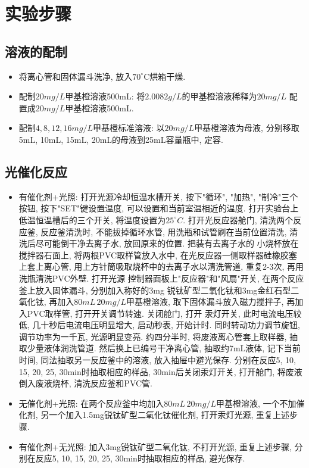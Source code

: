 \documentclass[a4paper]{article}
\begin{document}
\section{实验步骤}
\subsection{溶液的配制}
\begin{itemize}
	\item 将离心管和固体漏斗洗净, 放入$70^\circ$C烘箱干燥.
	\item 配制$20mg/L$甲基橙溶液500mL: 将$2.0082g/L$的甲基橙溶液稀释为$20mg/L$
	配置成$20mg/L$甲基橙溶液500mL.
	\item 配制$4, 8, 12, 16mg/L$甲基橙标准溶液: 以$20mg/L$甲基橙溶液为母液, 分别移取5mL, 
	10mL, 15mL, 20mL的母液到25mL容量瓶中, 定容.
\end{itemize}
\subsection{光催化反应}
\begin{itemize}
	\item 有催化剂+光照: 打开光源冷却恒温水槽开关, 按下"循环", "加热", "制冷"三个按钮, 
	按下"SET"键设置温度, 可以设置和当前室温相近的温度. 打开实验台上低温恒温槽后的三个开关, 
	将温度设置为$25^\circ C$. 打开光反应器舱门, 清洗两个反应釜, 反应釜清洗时, 不能拔掉循环水管, 
	用洗瓶和试管刷在当前位置清洗, 清洗后尽可能倒干净去离子水, 放回原来的位置. 把装有去离子水的
	小烧杯放在搅拌器石面上, 将两根PVC取样管放入水中, 在光反应器一侧取样器硅橡胶塞上套上离心管,
	用上方针筒吸取烧杯中的去离子水以清洗管道, 重复2-3次, 再用洗瓶清洗PVC外壁. 打开光源
	控制器面板上"反应器"和"风扇"开关, 在两个反应釜上放入固体漏斗, 分别加入称好的3mg
	锐钛矿型二氧化钛和3mg金红石型二氧化钛, 再加入$80mL\,20mg/L$甲基橙溶液, 
	取下固体漏斗放入磁力搅拌子, 再加入PVC取样管, 打开开关调节转速. 关闭舱门, 打开
	汞灯开关, 此时电流电压较低, 几十秒后电流电压明显增大, 启动秒表, 开始计时. 同时转动功力调节旋钮, 
	调节功率为一千瓦, 光源明显变亮. 约四分半时, 将废液离心管套上取样器, 抽取少量液体润洗管道. 
	然后换上已编号干净离心管, 抽取约7mL液体, 记下当前时间, 同法抽取另一反应釜中的溶液, 
	放入抽屉中避光保存. 分别在反应5, 10, 15, 20, 25, 30min时抽取相应的样品, 30min后关闭汞灯开关, 
	打开舱门, 将废液倒入废液烧杯, 清洗反应釜和PVC管.
	\item 无催化剂+光照: 在两个反应釜中均加入$80mL\,20mg/L$甲基橙溶液, 
	一个不加催化剂, 另一个加入1.5mg锐钛矿型二氧化钛催化剂, 打开汞灯光源, 
	重复上述步骤.
	\item 有催化剂+无光照: 加入3mg锐钛矿型二氧化钛, 不打开光源, 重复上述步骤, 
	分别在反应5, 10, 15, 20, 25, 30min时抽取相应的样品, 避光保存.
\end{itemize}
\end{document}
